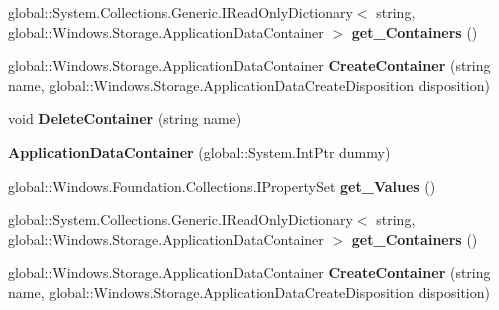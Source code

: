 \begin{DoxyCompactItemize}
global\+::\+System.\+Collections.\+Generic.\+I\+Read\+Only\+Dictionary$<$ string, global\+::\+Windows.\+Storage.\+Application\+Data\+Container $>$ {\bfseries get\+\_\+\+Containers} ()
\item 
\mbox{\label{class_windows_1_1_storage_1_1_application_data_container_ad7aefe4a6e2c696f8ac1044c1649ab0a}} 
global\+::\+Windows.\+Storage.\+Application\+Data\+Container {\bfseries Create\+Container} (string name, global\+::\+Windows.\+Storage.\+Application\+Data\+Create\+Disposition disposition)
\item 
\mbox{\label{class_windows_1_1_storage_1_1_application_data_container_ae10280581ba75a8732781e66d0037ef0}} 
void {\bfseries Delete\+Container} (string name)
\item 
\mbox{\label{class_windows_1_1_storage_1_1_application_data_container_a0649013a245656d416ecc5a7f192010b}} 
{\bfseries Application\+Data\+Container} (global\+::\+System.\+Int\+Ptr dummy)
\item 
\mbox{\label{class_windows_1_1_storage_1_1_application_data_container_a3c0afb245420d44945e67800bf1aae9f}} 
global\+::\+Windows.\+Foundation.\+Collections.\+I\+Property\+Set {\bfseries get\+\_\+\+Values} ()
\item 
\mbox{\label{class_windows_1_1_storage_1_1_application_data_container_a361c8478595cda5b8019768201c65b27}} 
global\+::\+System.\+Collections.\+Generic.\+I\+Read\+Only\+Dictionary$<$ string, global\+::\+Windows.\+Storage.\+Application\+Data\+Container $>$ {\bfseries get\+\_\+\+Containers} ()
\item 
\mbox{\label{class_windows_1_1_storage_1_1_application_data_container_ad7aefe4a6e2c696f8ac1044c1649ab0a}} 
global\+::\+Windows.\+Storage.\+Application\+Data\+Container {\bfseries Create\+Container} (string name, global\+::\+Windows.\+Storage.\+Application\+Data\+Create\+Disposition disposition)
\item 
\mbox{\label{class_windows_1_1_storage_1_1_application_data_container_ae10280581ba75a8732781e66d0037ef0}} 

\end{DoxyCompactItemize}
